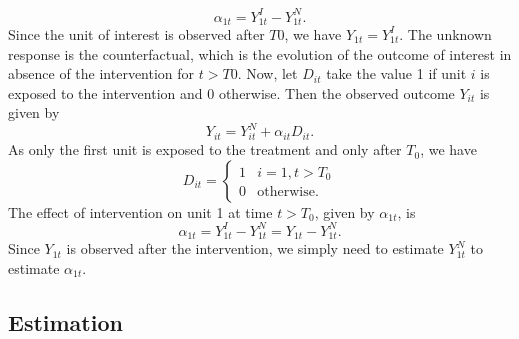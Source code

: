 \documentclass[12pt,nobind, a4paper]{reedthesis}
\begin{document}
 \[\alpha_{1t}= Y^{I}_{1t}-Y^{N}_{1t}.\]
 Since the unit of interest is observed after \(T0\), we have \(Y_{1t}=Y^{I}_{1t}\). The unknown response is the counterfactual, which is the evolution of the outcome of interest in absence of the intervention for \(t>T0\). Now, let \(D_{it}\) take the value 1 if unit \(i\) is exposed to the intervention and 0 otherwise. Then the observed outcome \(Y_{it}\) is given by
 \begin{equation}
 Y_{it}= Y^{N}_{it} + \alpha_{it} D_{it}.
 \label{eq:eq1}
 \end{equation}
 As only the first unit is exposed to the treatment and only after \(T_0\), we have
 \begin{equation}
 D_{it} = 
 \begin{cases} 
 1 &  i=1, t>T_0 \\
  0 &\text{otherwise}.
 \end{cases}
 \label{eq:eq2}
 \end{equation}
 The effect of intervention on unit 1 at time \(t>T_0\), given by \(\alpha_{1t}\), is
 \begin{equation}
 \alpha_{1t}= Y^{I}_{1t}-Y^{N}_{1t}= Y_{1t}-Y^{N}_{1t}.
 \label{eq:eq3}
 \end{equation}
 Since \(Y_{1t}\) is observed after the intervention, we simply need to estimate \(Y^{N}_{1t}\) to estimate \(\alpha_{1t}\).

 \hypertarget{estimation}{%
 \subsection{Estimation}\label{estimation}}
\end{document}
